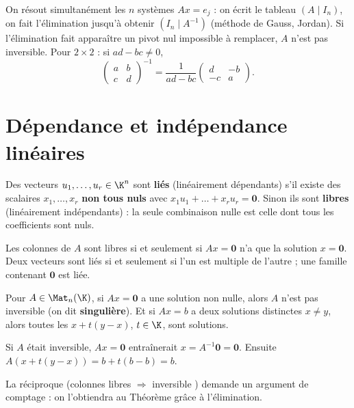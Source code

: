 \begin{methode}[Calculer $A^{-1}$]
On résout simultanément les $n$ systèmes $Ax=e_j$ : on écrit le tableau $(A\mid I_n)$, on fait l'élimination jusqu'à obtenir $(I_n\mid A^{-1})$ (méthode de Gauss, Jordan). Si l'élimination fait apparaître un pivot nul impossible à remplacer, $A$ n'est pas inversible. Pour $2\times2$ : si $ad-bc\neq0$,
\[\begin{pmatrix}a&b\\c&d\end{pmatrix}^{-1}=\frac1{ad-bc}\begin{pmatrix}d&-b\\-c&a\end{pmatrix}.\]
\end{methode}

\section{Dépendance et indépendance linéaires}
\begin{definition}\label{def-libre}
Des vecteurs $u_1,\dots,u_r\in\K^n$ sont \textbf{liés} (linéairement dépendants) s'il existe des scalaires $x_1,\dots,x_r$ \textbf{non tous nuls} avec $x_1u_1+\dots+x_ru_r=\mathbf 0$. Sinon ils sont \textbf{libres} (linéairement indépendants) : la seule combinaison nulle est celle dont tous les coefficients sont nuls.
\end{definition}
\begin{remarque}
Les colonnes de $A$ sont libres si et seulement si $Ax=\mathbf 0$ n'a que la solution $x=\mathbf 0$. Deux vecteurs sont liés si et seulement si l'un est multiple de l'autre ; une famille contenant $\mathbf 0$ est liée.
\end{remarque}
\begin{proposition}\label{prop-singuliere}
Pour $A\in\Mat_n(\K)$, si $Ax=\mathbf 0$ a une solution non nulle, alors $A$ n'est pas inversible (on dit \textbf{singulière}). Et si $Ax=b$ a deux solutions distinctes $x\neq y$, alors toutes les $x+t(y-x)$, $t\in\K$, sont solutions.
\end{proposition}
\begin{preuve}
Si $A$ était inversible, $Ax=\mathbf 0$ entraînerait $x=A^{-1}\mathbf 0=\mathbf 0$. Ensuite $A(x+t(y-x))=b+t(b-b)=b$.
\end{preuve}
La réciproque (\og colonnes libres $\Rightarrow$ inversible \fg) demande un argument de comptage : on l'obtiendra au Théorème  grâce à l'élimination.

